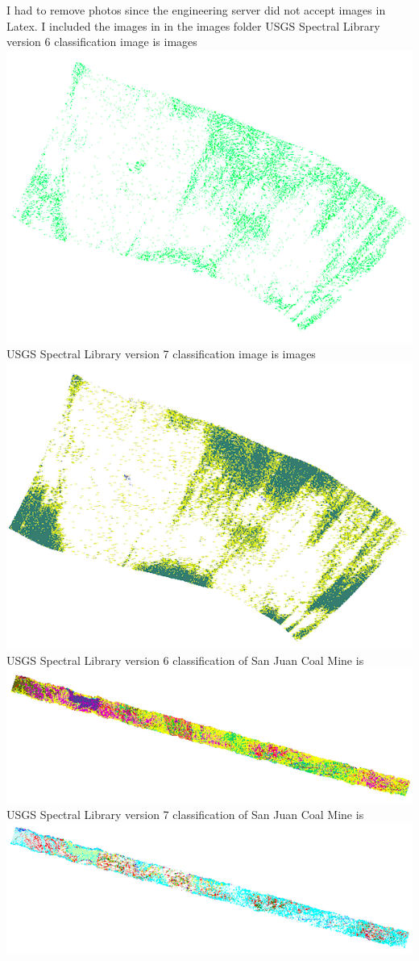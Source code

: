 \documentclass[onecolumn, draftclsnofoot,10pt, compsoc]{IEEEtran}
\begin{document}
I had to remove photos since the engineering server did not accept images in Latex.
\newline
I included the images in in the images folder
\newline
USGS Spectral Library version 6 classification image is images \includegraphics[width=.6\textwidth,left]{images/S061.png}
\newline
USGS Spectral Library version 7 classification image is images \includegraphics[width=.6\textwidth,left]{images/S071.png}
\newline
USGS Spectral Library version 6 classification of San Juan Coal Mine is \includegraphics[width=.6\textwidth,left]{images/S062.png}
\newline
USGS Spectral Library version 7 classification of San Juan Coal Mine is \includegraphics[width=.6\textwidth,left]{images/S072.png}
\end{document}
